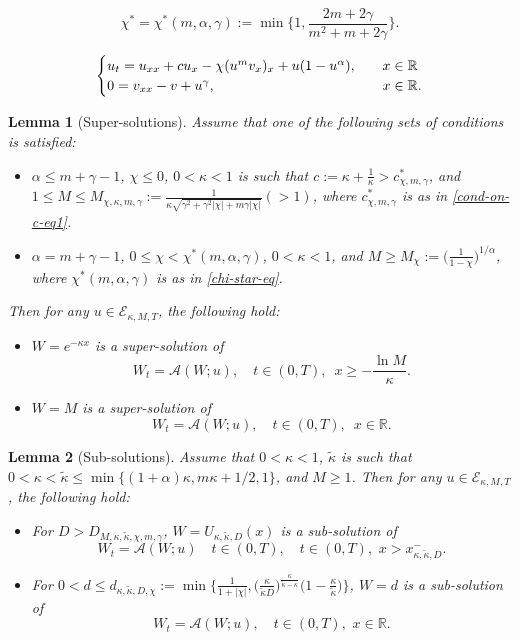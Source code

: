 \documentclass[10pt,a4paper]{amsart}
\newtheorem{lemma}{Lemma}
\newcommand\RR{\ensuremath{\mathbb{R}}}
\begin{document}
\begin{equation}
\label{chi-star-eq}
\chi^*=\chi^*(m,\alpha,\gamma):=\min\Big\{1, \frac{2m+2\gamma}{m^2+m+2\gamma}\Big\}.
\end{equation}

\begin{equation}
\label{main-moving-eq1}
\begin{cases}
u_t=u_{xx}+cu_x-\chi(u^m v_x)_x +u(1-u^\alpha),\quad &x\in\RR\cr
0=v_{xx}-v+u^\gamma,\quad&x\in\RR.
\end{cases}
\end{equation}

\begin{lemma}[Super-solutions]
\label{prelim-super-lm} 
Assume that one of the following sets of conditions is satisfied:
\begin{itemize}
\item[(i)]  $\alpha\le m+\gamma -1$,  $\chi\le 0$, 
   $0<\kappa <1$ is such that $c:=\kappa+\frac{1}{\kappa}>c_{\chi,m,\gamma}^*$,
 and
$1\le M\le M_{\chi,\kappa,m,\gamma}:=\frac{1}{\kappa \sqrt {\gamma^2+\gamma^2|\chi|+m\gamma |\chi|}}(>1)$, where $c^*_{\chi,m,\gamma}$ is as in  \eqref{cond-on-c-eq1}.
  
\item[(ii)] $\alpha=m+\gamma-1$,    $0\le \chi<\chi^*(m,\alpha,\gamma)$,  
   $0<\kappa <1$,  and   $M\ge M_\chi:=\big( \frac{1}{1-\chi}\big)^{1/\alpha}$, where $\chi^*(m,\alpha,\gamma)$ is as in \eqref{chi-star-eq}.
\end{itemize}
Then 
for any $u\in \mathcal{E}_{\kappa,M,T}$, the following hold:
\begin{itemize}
\item[(1)]  $W= e^{-\kappa x}$ is a super-solution of
$$
W_t=\mathcal{A}(W;u), \quad t\in (0,T),\, \,\, x\ge -\frac{\ln M}{\kappa}.
$$

\item[(2)]   $W=M$ is a super-solution of
$$
W_t=\mathcal{A}(W;u), \quad t\in (0,T),\,\,\, x\in\RR.
$$
\end{itemize}
\end{lemma}

\begin{lemma}[Sub-solutions]
\label{prelim-sub-lm}
Assume that  $0<\kappa<1$,   $\tilde \kappa$ is such that $0<\kappa<\tilde \kappa \le \min\{ (1+\alpha)\kappa,  m\kappa +1/2,  1\}$, and $M\ge 1$.
Then 
for any $u\in \mathcal{E}_{\kappa,M,T}$, the following hold:
\begin{itemize}
\item[(1)] For $D> D_{M,\kappa,\tilde\kappa,\chi,m,\gamma}$, 
{$W=U_{\kappa,\tilde\kappa, D}(x)$}  is a sub-solution of
$$
W_t= \mathcal{A}(W;u)\quad  t\in (0,T),\quad t\in (0,T),\,\,  x>x^-_{\kappa,\tilde\kappa,D}.
$$


\item[(2)]   For $0<d\le  d_{\kappa,\tilde \kappa,D,\chi}:=\min\Big\{\frac{1}{1+|\chi|}, \Big(\frac{\kappa}{\tilde\kappa D}\Big)^{\frac{\kappa}{\tilde \kappa -\kappa}}\Big(1-\frac{\kappa}{\tilde \kappa}\Big)\Big\}$, $W=d$ is a sub-solution of
$$
W_t= \mathcal{A}(W;u),\quad t\in (0,T),\,\,  x\in\RR.
$$ 
\end{itemize}
\end{lemma}
\end{document}
